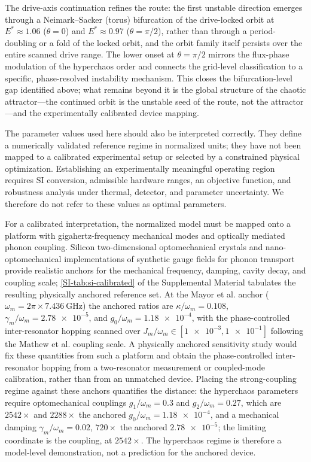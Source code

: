\documentclass[aip,cha,reprint]{revtex4-2}
\begin{document}
The drive-axis continuation refines the route: the first unstable direction
emerges through a Neimark--Sacker (torus) bifurcation of the drive-locked orbit
at $E^{*}\approx\num{1.06}$ ($\theta=0$) and $E^{*}\approx\num{0.97}$
($\theta=\pi/2$), rather than through a period-doubling or a fold of the locked
orbit, and the orbit family itself persists over the entire scanned drive range.
The lower onset at $\theta=\pi/2$ mirrors the flux-phase modulation of the
hyperchaos order and connects the grid-level classification to a specific,
phase-resolved instability mechanism. This closes the bifurcation-level gap
identified above; what remains beyond it is the global structure of the
chaotic attractor---the continued orbit is the unstable seed of the route, not
the attractor---and the experimentally calibrated device mapping.

The parameter values used here should also be interpreted correctly. They define a
numerically validated reference regime in normalized units; they have not been mapped
to a calibrated experimental setup or selected by a constrained physical
optimization. Establishing an experimentally meaningful operating region requires
SI conversion, admissible hardware ranges, an objective function, and robustness
analysis under thermal, detector, and parameter uncertainty. We therefore do not refer to these values as optimal parameters.

For a calibrated interpretation, the normalized model must be mapped onto a platform
with gigahertz-frequency mechanical modes and optically mediated phonon coupling.
Silicon two-dimensional optomechanical crystals \cite{Mayor2025} and
nano-optomechanical implementations of synthetic gauge fields for phonon transport
\cite{Mathew2020} provide realistic anchors for the mechanical frequency, damping,
cavity decay, and coupling scale; \cref{SI-tab:si-calibrated} of the Supplemental
Material tabulates the resulting physically anchored reference set. At the Mayor et al. anchor
($\omega_m=2\pi\times\num{7.436}~\si{\giga\hertz}$) the anchored ratios are
$\kappa/\omega_m=\num{0.108}$, $\gamma_m/\omega_m=\num{2.78e-5}$, and
$g_0/\omega_m=\num{1.18e-4}$, with the phase-controlled inter-resonator hopping
scanned over $J_m/\omega_m\in[\num{1e-3},\num{1e-1}]$ following the Mathew et al.
coupling scale. A physically anchored sensitivity study would fix
these quantities from such a platform and obtain the phase-controlled inter-resonator
hopping from a two-resonator measurement or coupled-mode calibration, rather than
from an unmatched device. Placing the strong-coupling regime against these
anchors quantifies the distance: the hyperchaos parameters require optomechanical
couplings $g_1/\omega_m=\num{0.3}$ and $g_2/\omega_m=\num{0.27}$, which are
$\num{2542}\times$ and $\num{2288}\times$ the anchored $g_0/\omega_m=\num{1.18e-4}$,
and a mechanical damping $\gamma_m/\omega_m=\num{0.02}$, $\num{720}\times$ the
anchored $\num{2.78e-5}$; the limiting coordinate is the coupling, at
$\num{2542}\times$. The hyperchaos regime is therefore a model-level
demonstration, not a prediction for the anchored device.
\end{document}
